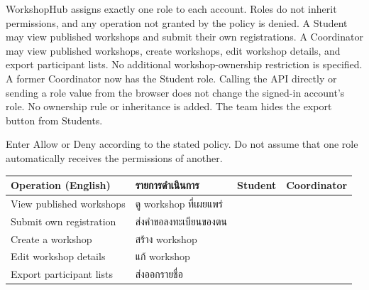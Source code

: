 \begin{contenttable}
{WorkshopHub assigns exactly one role to each account. Roles do not inherit permissions, and any operation not granted by the policy is denied. A Student may view published workshops and submit their own registrations.}
{A Coordinator may view published workshops, create workshops, edit workshop details, and export participant lists. No additional workshop-ownership restriction is specified.}
{A former Coordinator now has the Student role. Calling the API directly or sending a role value from the browser does not change the signed-in account’s role. No ownership rule or inheritance is added. The team hides the export button from Students.}

\end{contenttable}

{Enter Allow or Deny according to the stated policy. Do not assume that one role automatically receives the permissions of another.}
\begin{tabularx}{\linewidth}{|P|P|M{2.1cm}|M{2.1cm}|}\hline
Operation (English) & รายการดำเนินการ & Student & Coordinator\\\hline
View published workshops & ดู workshop ที่เผยแพร่ &\rule{0pt}{.62cm}&\\\hline
Submit own registration & ส่งคำขอลงทะเบียนของตน &\rule{0pt}{.62cm}&\\\hline
Create a workshop & สร้าง workshop &\rule{0pt}{.62cm}&\\\hline
Edit workshop details & แก้ workshop &\rule{0pt}{.62cm}&\\\hline
Export participant lists & ส่งออกรายชื่อ &\rule{0pt}{.62cm}&\\\hline
\end{tabularx}

